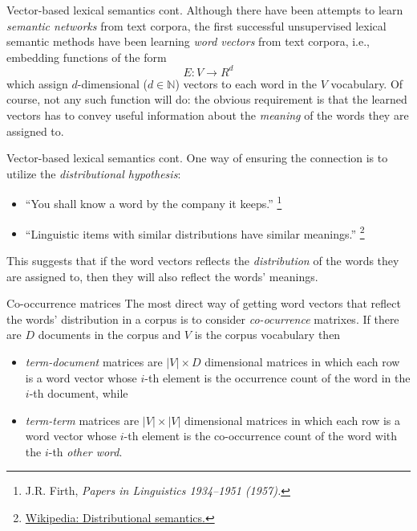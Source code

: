 \documentclass[style=upen, size=14pt]{powerdot}
\newcommand{\gold}{\color{arany}}
\theoremstyle{definition}
\begin{document}
\begin{slide}[toc=]{Vector-based lexical semantics cont.}
  Although there have been attempts to learn \emph{semantic networks} from text
  corpora, the first successful unsupervised lexical semantic methods have been
  learning \emph{\gold word vectors} from text corpora, i.e., embedding
  functions of the form
  $$
  E: V \rightarrow R^d
  $$
  which assign $d$-dimensional ($d\in \mathbb N$) vectors to each word in the
  $V$ vocabulary. Of course, not any such function will do: the obvious
  requirement is that the learned vectors has to convey useful information about
  the \emph{meaning} of the words they are assigned to.
\end{slide}

\begin{slide}[toc=]{Vector-based lexical semantics cont.}
  One way of ensuring the connection is to utilize the \emph{distributional hypothesis}:
  \begin{itemize}
  \item ``You shall know a word by the company it keeps.''
    \footnote{J.R. Firth, \emph{Papers in Linguistics 1934--1951 (1957).}}
  \item ``Linguistic items with similar distributions have similar meanings.''
    \footnote{\href{https://en.wikipedia.org/wiki/Distributional_semantics}{Wikipedia:
        Distributional semantics.}}
  \end{itemize}
  This suggests that if the word vectors reflects the \emph{distribution} of the
  words they are assigned to, then they will also reflect the words' meanings.
\end{slide}

\begin{slide}[toc=]{Co-occurrence matrices}
  The most direct way of getting word vectors that reflect the words'
  distribution in a corpus is to consider \emph{co-ocurrence} matrixes. If there
  are $D$ documents in the corpus and $V$ is the corpus vocabulary then
  \begin{itemize}
  \item \emph{\gold term-document} matrices are $|V|\times D$ dimensional
    matrices in which each row is a word vector whose $i$-th element is the
    occurrence count of the word in the $i$-th document, while
  \item \emph{\gold term-term} matrices are $|V|\times |V|$ dimensional matrices
    in which each row is a word vector whose $i$-th element is the co-occurrence
    count of the word with the $i$-th \emph{other word}.
  \end{itemize}
\end{slide}
\end{document}
